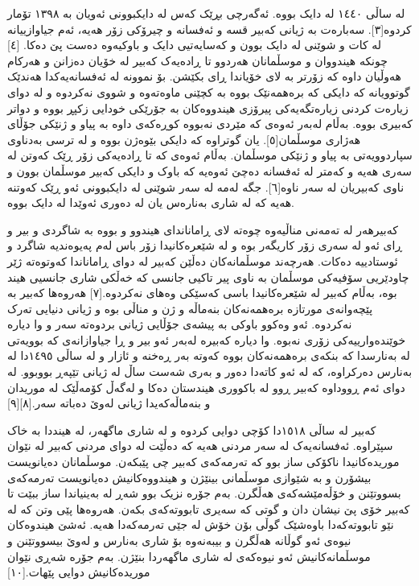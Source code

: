 \documentclass[a4paper]{article}
\begin{document}
لە ساڵی ١٤٤٠ لە دایک بووە. ئەگەرچی بڕێک کەس لە دایکبوونی ئەویان بە ١٣٩٨ تۆمار کردوە[٣]. سەبارەت بە ژیانی کەبیر قسە و ئەفسانە و چیرۆکی زۆر ھەیە، ئەم جیاوازییانە لە کات و شوێنی لە دایک بوون و کەسایەتیی دایک و باوکیەوە دەست پێ دەکا. [٤] چونکە ھیندووان و موسڵمانان ھەردوو تا ڕادەیەک کەبیر لە خۆیان دەزانن و ھەرکام ھەوڵیان داوە کە زۆرتر بە لای خۆیاندا ڕای بکێشن. بۆ نموونە لە ئەفسانەیەکدا ھەندێک گوتوویانە کە دایکی کە برەھمەنێک بووە بە کچێنی ماوەتەوە و شووی نەکردوە و لە دوای زیارەت کردنی زیارەتگەیەکی پیرۆزی ھیندووەکان بە جۆرێکی خودایی زکپڕ بووە و دواتر کەبیری بووە. بەڵام لەبەر ئەوەی کە مێردی نەبووە کوڕەکەی داوە بە پیاو و ژنێکی جۆڵای ھەژاری موسڵمان[٥]. یان گوتراوە کە دایکی بێوەژن بووە و لە ترسی بەدناوی سپاردوویەتی بە پیاو و ژنێکی موسڵمان. بەڵام ئەوەی کە تا ڕادەیەکی زۆر ڕێک کەوتن لە سەری ھەیە و کەمتر لە ئەفسانە دەچێ ئەوەیە کە باوک و دایکی کەبیر موسڵمان بوون و ناوی کەبیریان لە سەر ناوە[٦]. جگە لەمە لە سەر شوێنی لە دایکبوونی ئەو ڕێک کەوتنە هەیە کە لە شاری بەنارەس یان لە دەوری ئەوێدا لە دایک بووە.

کەبیرھەر لە تەمەنی مناڵیەوە چوەتە لای ڕاماناندای ھیندوو و بووە بە شاگردی و بیر و ڕای ئەو لە سەری زۆر کاریگەر بوە و لە شێعرەکانیدا زۆر باس لەم پەیوەندیە شاگرد و ئوستادییە دەکات. ھەرچەند موسڵمانەکان دەڵێن کەبیر لە دوای ڕاماناندا کەوتوەتە ژێر چاودێریی سۆفیەکی موسڵمان بە ناوی پیر تاکیی جانسی کە خەڵکی شاری جانسیی ھیند بوە، بەڵام کەبیر لە شێعرەکانیدا باسی کەسێکی وەھای نەکردوە.[٧] ھەروەھا کەبیر بە پێچەوانەی مورتازە برەھمەنەکان بنەماڵە و ژن و مناڵی بوە و ژیانی دنیایی تەرک نەکردوە. ئەو وەکوو باوکی بە پیشەی جۆڵایی ژیانی بردوەتە سەر و وا دیارە خوێندەوارییەکی زۆری نەبوە. وا دیارە کەبیرە لەبەر ئەو بیر و ڕا جیاوازانەی کە بوویەتی لە بەنارسدا کە بنکەی برەھمەنەکان بووە کەوتە بەر ڕەخنە و ئازار و لە ساڵی ١٤٩٥دا لە بەنارس دەرکراوە، کە لە ئەو کاتەدا دەور و بەری شەست ساڵ لە ژیانی تێپەڕ بووبوو. لە دوای ئەم ڕووداوە کەبیر ڕوو لە باکووری ھیندستان دەکا و لەگەڵ کۆمەڵێک لە موریدان و بنەماڵەکەیدا ژیانی لەوێ دەباتە سەر.[٨][٩]

کەبیر لە ساڵی ١٥١٨دا کۆچی دوایی کردوە و لە شاری ماگھەر، لە ھینددا بە خاک سپێراوە. ئەفسانەیەک لە سەر مردنی ھەیە کە دەڵێت لە دوای مردنی کەبیر لە نێوان موریدەکانیدا ناکۆکی ساز بوو کە تەرمەکەی کەبیر چی پێبکەن. موسڵمانان دەیانویست بیشۆرن و بە شێوازی موسڵمانی بینێژن و ھیندووەکانیش دەیانویست تەرمەکەی بسووتێنن و خۆڵەمێشەکەی ھەڵگرن. بەم جۆرە نزیک بوو شەڕ لە بەینیاندا ساز ببێت تا کەبیر خۆی پێ نیشان دان و گوتی کە سەیری تابووتەکەی بکەن. ھەروەھا پێی وتن کە لە نێو تابووتەکەدا باوەشێک گوڵی بۆن خۆش لە جێی تەرمەکەدا ھەیە. ئەشێ ھیندوەکان نیوەی ئەو گوڵانە ھەڵگرن و بیبەنەوە بۆ شاری بەنارس و لەوێ بیسووتێنن و موسڵمانەکانیش ئەو نیوەکەی لە شاری ماگھەردا بنێژن. بەم جۆرە شەڕی نێوان موریدەکانیش دوایی پێھات.[١٠]
\end{document}
